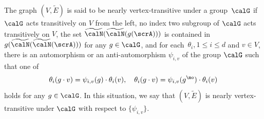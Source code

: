 \begin{definition}
\label{Defn:NearlyVertexTra}
The graph $(V, \widetilde E)$ is said to be \textnormal{nearly vertex-transitive under a group}~$\calG$ if $\calG$ acts transitively on $V$ from the left, no index two subgroup of $\calG$ acts transitively on $V$, the set 
$
\widetilde \calN (\widetilde \calN(g(\scrA)))$ 
is contained in 
$g(\widetilde \calN(\widetilde \calN(\scrA)))
$ 
for any $g\in \calG$, and for each~$\theta_i, 1\leq i\leq d$ and $v\in V$, there is an automorphism or an anti-automorphism $\psi_{i,v}$ of the group $\calG$ such that one of 
$$\theta_i(g\cdot v) =  \psi_{i,v}(g) \cdot \theta_i(v), 
\quad 
\theta_i(g\cdot v) =  \psi_{i, v}(g^\mo) \cdot \theta_i(v)$$
holds for any $g\in \calG$. In this situation, we say that $(V, \widetilde E)$ is \textnormal{nearly vertex-transitive under $\calG$ with respect to} $\{\psi_{i,v}\}$.
\end{definition}
